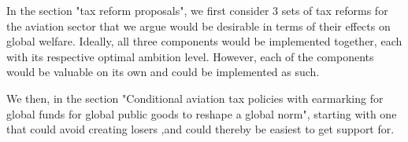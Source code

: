 In the section "tax reform proposals", we first consider 3 sets of tax reforms for the aviation sector that we argue would be desirable in terms of their effects on global welfare. Ideally, all three components would be implemented together, each with its respective optimal ambition level. However, each of the components would be valuable on its own and could be implemented as such. 

We then, in the section "Conditional aviation tax policies with earmarking for global funds for global public goods to reshape a global norm", 
starting with one that could avoid creating losers ,and could thereby be easiest to get support for.